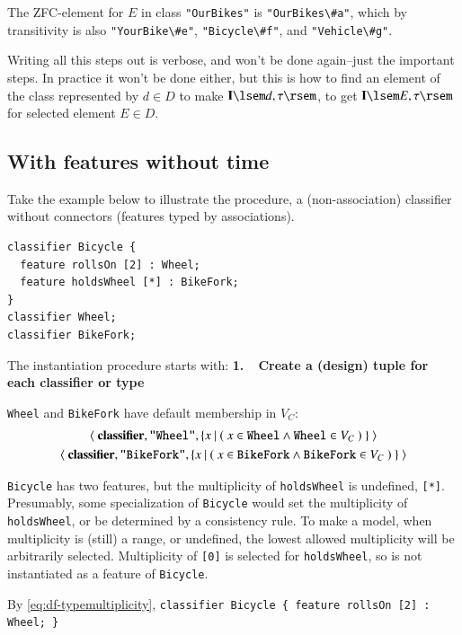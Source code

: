 The ZFC-element for $E$ in class \texttt{"OurBikes"} is \texttt{"OurBikes\textbackslash\#a"}, which by transitivity is also \texttt{"YourBike\textbackslash\#e"}, \texttt{"Bicycle\textbackslash\#f"}, and \texttt{"Vehicle\textbackslash\#g"}.

Writing all this steps out is verbose, and won't be done again--just the important steps.
In practice it won't be done either, but this is how to find an element of the class represented by $d\in D$ to make $\mathbf{I}\lsem d,\tau\rsem$, to get 
$\mathbf{I}\lsem E,\tau\rsem$ for selected element $E\in D$.

\subsection{With features without time}

Take the example below to illustrate the procedure, a (non-association) classifier without connectors (features typed by associations).
\begin{lstlisting}
classifier Bicycle {
  feature rollsOn [2] : Wheel; 
  feature holdsWheel [*] : BikeFork;
}
classifier Wheel; 
classifier BikeFork;
\end{lstlisting}

The instantiation procedure starts with:
\textbf{1.~~Create a (design) tuple for each classifier or type}

\texttt{Wheel} and \texttt{BikeFork} have default membership in $V_C$:
\begin{gather}
\langle~\textbf{classifier},\texttt{"Wheel"},\{x~\vert ~(~ x \in \texttt{Wheel} \wedge \texttt{Wheel}\in V_C~)~\}~\rangle \notag \\
\langle~\textbf{classifier},\texttt{"BikeFork"},\{x~\vert ~(~ x \in \texttt{BikeFork} \wedge \texttt{BikeFork}\in V_C~)~\}~\rangle
\label{eq:wheel}
\end{gather}

\texttt{Bicycle} has two features, but the multiplicity of \texttt{holdsWheel} is undefined, \texttt{[*]}.  Presumably, some specialization of \texttt{Bicycle} would set the multiplicity of 
\texttt{holdsWheel}, or be determined by a consistency rule.  To make a model, when multiplicity is (still) a range, or undefined, the lowest allowed multiplicity will be arbitrarily selected.  Multiplicity of \texttt{[0]} is selected for \texttt{holdsWheel}, so is not instantiated as a feature of \texttt{Bicycle}.

By \ref{eq:df-typemultiplicity}, \texttt{classifier Bicycle \{ feature rollsOn [2] : Wheel; \}} 

